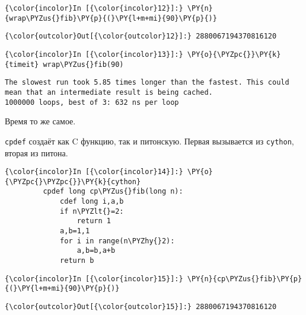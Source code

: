     \begin{Verbatim}[commandchars=\\\{\}]
{\color{incolor}In [{\color{incolor}12}]:} \PY{n}{wrap\PYZus{}fib}\PY{p}{(}\PY{l+m+mi}{90}\PY{p}{)}
\end{Verbatim}

            \begin{Verbatim}[commandchars=\\\{\}]
{\color{outcolor}Out[{\color{outcolor}12}]:} 2880067194370816120
\end{Verbatim}
        
    \begin{Verbatim}[commandchars=\\\{\}]
{\color{incolor}In [{\color{incolor}13}]:} \PY{o}{\PYZpc{}}\PY{k}{timeit} wrap\PYZus{}fib(90)
\end{Verbatim}

    \begin{Verbatim}[commandchars=\\\{\}]
The slowest run took 5.85 times longer than the fastest. This could mean that an intermediate result is being cached.
1000000 loops, best of 3: 632 ns per loop

    \end{Verbatim}

    Время то же самое.

\texttt{cpdef} создаёт как C функцию, так и питонскую. Первая вызывается
из \texttt{cython}, вторая из питона.

    \begin{Verbatim}[commandchars=\\\{\}]
{\color{incolor}In [{\color{incolor}14}]:} \PY{o}{\PYZpc{}\PYZpc{}}\PY{k}{cython}
         cpdef long cp\PYZus{}fib(long n):
             cdef long i,a,b
             if n\PYZlt{}=2:
                 return 1
             a,b=1,1
             for i in range(n\PYZhy{}2):
                 a,b=b,a+b
             return b
\end{Verbatim}

    \begin{Verbatim}[commandchars=\\\{\}]
{\color{incolor}In [{\color{incolor}15}]:} \PY{n}{cp\PYZus{}fib}\PY{p}{(}\PY{l+m+mi}{90}\PY{p}{)}
\end{Verbatim}

            \begin{Verbatim}[commandchars=\\\{\}]
{\color{outcolor}Out[{\color{outcolor}15}]:} 2880067194370816120
\end{Verbatim}
        
